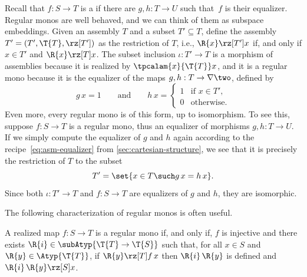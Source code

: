 Recall that $f : S \to T$ is a  if
there are $g, h : T \to U$ such that~$f$ is their
equalizer. Regular monos are well behaved, and we can think of them as
subspace embeddings. Given an assembly $T$ and a subset $T'
\subseteq T$, define the assembly $T' = (T', \T{T}, {\rz[T']})$
as the restriction of $T$, i.e., $\R{x} \rz[T'] x$ if, and only
if $x \in T'$ and $\R{x} \rz[T] x$. The subset inclusion $\iota : T'
\to T$ is a morphism of assemblies because it is realized by
$\tpcalam{x}{\T{T}} x$, and it is a regular mono because it is
the equalizer of the maps $g, h : T \to \nabla \two$, defined by
%
\begin{equation*}
  g\,x = 1
  \qquad\text{and}\qquad
  h\,x =
  \begin{cases}
    1 & \text{if $x \in T'$,}\\
    0 & \text{otherwise}.
  \end{cases}
\end{equation*}
%
Even more, every regular mono is of this form, up to isomorphism. To
see this, suppose $f : S \to T$ is a regular mono, thus an
equalizer of morphisms $g, h : T \to U$. If we simply
compute the equalizer of $g$ and $h$ again according to the
recipe~\eqref{eq:asm-equalizer} from
\cref{sec:cartesian-structure}, we see that it is precisely the
restriction of $T$ to the subset
% 
\begin{equation*}
  T' = \set{x \in T \such g\,x = h\,x}.
\end{equation*}
% 
Since both $\iota : T' \to T$ and $f : S \to
T$ are equalizers of $g$ and $h$, they are isomorphic.

The following characterization of regular monos is often useful.

\begin{proposition}
  \label{prop:reg-mono-when}%
  A realized map $f : S \to T$ is a regular mono if, and
  only if, $f$ is injective and there exists $\R{i} \in \subAtyp{\T{T}
    \to \T{S}}$ such that, for all $x \in S$ and $\R{y} \in \Atyp{\T{T}}$,
  if $\R{y} \rz[T] f\,x$ then $\R{i}\,\R{y}$ is defined and
  $\R{i}\,\R{y} \rz[S] x$.
\end{proposition}

